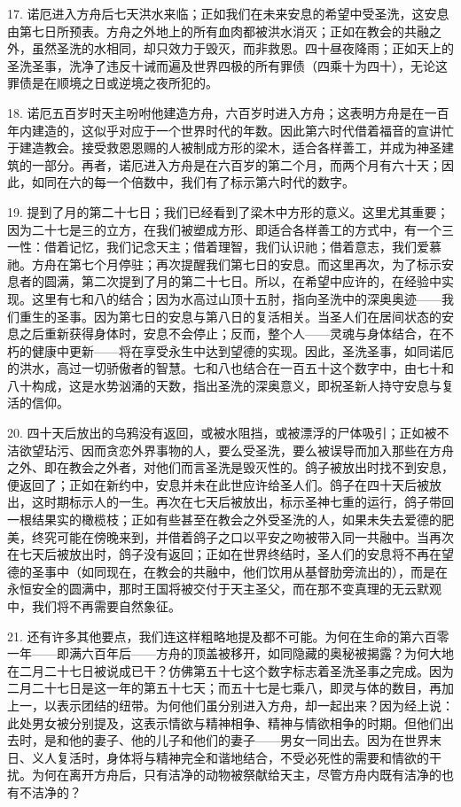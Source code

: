 17. 诺厄进入方舟后七天洪水来临；正如我们在未来安息的希望中受圣洗，这安息由第七日所预表。方舟之外地上的所有血肉都被洪水消灭；正如在教会的共融之外，虽然圣洗的水相同，却只效力于毁灭，而非救恩。四十昼夜降雨；正如天上的圣洗圣事，洗净了违反十诫而遍及世界四极的所有罪债（四乘十为四十），无论这罪债是在顺境之日或逆境之夜所犯的。\par

18. 诺厄五百岁时天主吩咐他建造方舟，六百岁时进入方舟；这表明方舟是在一百年内建造的，这似乎对应于一个世界时代的年数。因此第六时代借着福音的宣讲忙于建造教会。接受救恩恩赐的人被制成方形的梁木，适合各样善工，并成为神圣建筑的一部分。再者，诺厄进入方舟是在六百岁的第二个月，而两个月有六十天；因此，如同在六的每一个倍数中，我们有了标示第六时代的数字。\par

19. 提到了月的第二十七日；我们已经看到了梁木中方形的意义。这里尤其重要；因为二十七是三的立方，在我们被塑成方形、即适合各样善工的方式中，有一个三一性：借着记忆，我们记念天主；借着理智，我们认识祂；借着意志，我们爱慕祂。方舟在第七个月停驻；再次提醒我们第七日的安息。而这里再次，为了标示安息者的圆满，第二次提到了月的第二十七日。所以，在希望中应许的，在经验中实现。这里有七和八的结合；因为水高过山顶十五肘，指向圣洗中的深奥奥迹——我们重生的圣事。因为第七日的安息与第八日的复活相关。当圣人们在居间状态的安息之后重新获得身体时，安息不会停止；反而，整个人——灵魂与身体结合，在不朽的健康中更新——将在享受永生中达到望德的实现。因此，圣洗圣事，如同诺厄的洪水，高过一切骄傲者的智慧。七和八也结合在一百五十这个数字中，由七十和八十构成，这是水势汹涌的天数，指出圣洗的深奥意义，即祝圣新人持守安息与复活的信仰。\par

20. 四十天后放出的乌鸦没有返回，或被水阻挡，或被漂浮的尸体吸引；正如被不洁欲望玷污、因而贪恋外界事物的人，要么受圣洗，要么被误导而加入那些在方舟之外、即在教会之外者，对他们而言圣洗是毁灭性的。鸽子被放出时找不到安息，便返回了；正如在新约中，安息并未在此世应许给圣人们。鸽子在四十天后被放出，这时期标示人的一生。再次在七天后被放出，标示圣神七重的运行，鸽子带回一根结果实的橄榄枝；正如有些甚至在教会之外受圣洗的人，如果未失去爱德的肥美，终究可能在傍晚来到，并借着鸽子之口以平安之吻被带入同一共融中。当再次在七天后被放出时，鸽子没有返回；正如在世界终结时，圣人们的安息将不再在望德的圣事中（如同现在，在教会的共融中，他们饮用从基督肋旁流出的），而是在永恒安全的圆满中，那时王国将被交付于天主圣父，而在那不变真理的无云默观中，我们将不再需要自然象征。\par

21. 还有许多其他要点，我们连这样粗略地提及都不可能。为何在生命的第六百零一年——即满六百年后——方舟的顶盖被移开，如同隐藏的奥秘被揭露？为何大地在二月二十七日被说成已干？仿佛第五十七这个数字标志着圣洗圣事之完成。因为二月二十七日是这一年的第五十七天；而五十七是七乘八，即灵与体的数目，再加上一，以表示团结的纽带。为何他们虽分别进入方舟，却一起出来？因为经上说：此处男女被分别提及，这表示情欲与精神相争、精神与情欲相争的时期。但他们出去时，是和他的妻子、他的儿子和他们的妻子——男女一同出去。因为在世界末日、义人复活时，身体将与精神完全和谐地结合，不受必死性的需要和情欲的干扰。为何在离开方舟后，只有洁净的动物被祭献给天主，尽管方舟内既有洁净的也有不洁净的？\par

